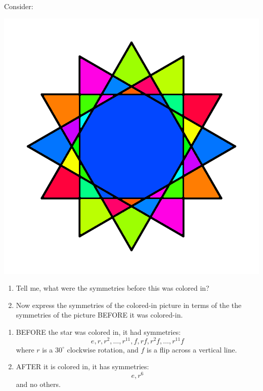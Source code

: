 \documentclass[noauthor,nooutcomes,12pt,hints]{ximera}
\begin{document}
\begin{question}
  Consider: 
 \begin{center}
  \includegraphics[width=.6\textwidth]{qR2D12.png}
 \end{center}
 \begin{enumerate}
 \item Tell me, what were the symmetries before this was colored in?
 \item Now express the symmetries of the colored-in picture in terms
    of the the symmetries of the picture BEFORE it was colored-in.
 \end{enumerate}
 \begin{freeResponse}
    \begin{enumerate}
    \item BEFORE the star was colored in, it had symmetries:
      \[
      e,r,r^2,\dots,r^{11}, f, rf,r^2f, \dots, r^{11}f
      \]
      where $r$ is a $30^\circ$ clockwise rotation, and $f$ is a flip
      across a vertical line.
    \item AFTER it is colored in, it has symmetries:
      \[
      e,r^6
      \]
      and no others.
    \end{enumerate}
  \end{freeResponse}
\end{question}
\mynewpage
\end{document}
